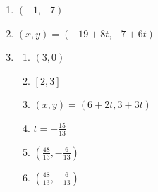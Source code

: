 \documentclass{article}
\begin{document}
\begin{enumerate}
\begin{enumerate}
	\item Isosceles
	
	\item $45\degree$

	\end{enumerate}
	
\item $(-1, -7)$

\item $(x, y) = (-19 + 8t, -7 + 6t)$

\item \begin{enumerate}

	\item $(3, 0)$
	
	\item $[2, 3]$
	
	\item $(x, y) = (6 + 2t, 3 + 3t)$
	
	\item $t = -\frac{15}{13}$
	
	\item $\left( \frac{48}{13}, -\frac{6}{13} \right)$
	
	\item $\left( \frac{48}{13}, -\frac{6}{13} \right)$

	\end{enumerate}

\end{enumerate}
\end{document}

